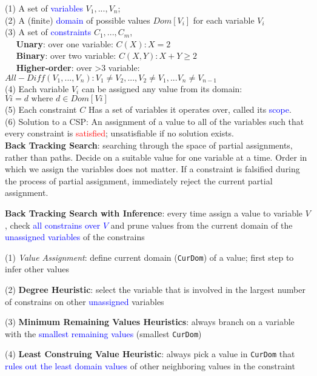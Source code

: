\documentclass[7pt,landscape]{article}
\begin{document}
\begin{multicols}{2}
(1) A set of \textcolor{blue}{variables} $V_1, ..., V_n$;  \\
(2) A (finite) \textcolor{blue}{domain} of possible values $Dom[V_i]$ for each variable $V_i$ \\
(3) A set of \textcolor{blue}{constraints} $C_1, ..., C_m$, \\
$\quad$ \textbf{Unary}: over one variable: $C(X): X = 2$ \\
$\quad$ \textbf{Binary}: over two variable: $C(X, Y): X + Y  \ge 2$ \\
$\quad$ \textbf{Higher-order}: over >3 variable: $All - Diff(V_1, ..., V_{n}): V_1 \neq V_2, ..., V_2 \neq V_1, ...V_{n} \neq V_{n-1}$ \\
(4) Each variable $V_i$ can be assigned any value from its domain: $Vi = d \text{ where } d \in Dom[Vi]$ \\
(5) Each constraint $C$ Has a set of variables it operates over, called its \textcolor{blue}{scope}.\\
(6) Solution to a CSP: An assignment of a value to all of the variables such that every constraint is \textcolor{red}{satisfied}; unsatisfiable if no solution exists. \\

\textbf{Back Tracking Search}: searching through the space of partial assignments, rather than paths. Decide on a suitable value for one variable at a time. Order in which we assign the variables does not matter. If a constraint is falsified during the process of partial assignment, immediately reject the current partial assignment.

\textbf{Back Tracking Search  with Inference}: every time assign a value to variable $V$, check \textcolor{blue}{all constrains over $V$} and prune values from the current domain of the \textcolor{blue}{unassigned variables} of the constrains

(1) \textit{Value Assignment}: define current domain (\texttt{CurDom}) of a value; first step to infer other values

(2) \textbf{Degree Heuristic}: select the variable that is involved in the largest number of constrains on other \textcolor{blue}{unassigned} variables

(3) \textbf{Minimum Remaining Values Heuristics}: always branch on a variable with the \textcolor{blue}{smallest remaining values} (smallest \texttt{CurDom})

(4) \textbf{Least Construing Value Heuristic}: always pick a value in \texttt{CurDom} that \textcolor{blue}{rules out the least domain values} of other neighboring values in the constraint



\end{multicols}
\end{document}
